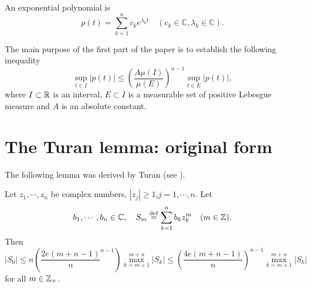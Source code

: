 \begin{definition}
  An exponential polynomial is
  \[
    p(t)=\sum_{k=1}^{n} c_k e^{\lambda_kt}\quad \left( c_k \in \mathbb{C},\lambda_k \in \mathbb{C} \right) .
  \]
\end{definition}
The main purpose of the first part of the paper is to establish the following inequality
\begin{equation}
  \sup_{t\in I}\left| p\left( t \right)  \right| \le \left( \frac{A\mu(I)}{\mu(E)} \right) ^{n-1}\sup_{t\in E}\left| p(t) \right| ,\label{main}
\end{equation}
where $I\subset \mathbb{R}$ is an interval, $E\subset I$ is a measurable set of positive Lebesgue measure and $A$ is an  absolute constant.
\section{The Turan lemma: original form}
The following lemma was derived by Turan (see \cite{turan1953neue}).
\begin{theorem}\label{theorem-1}
  Let $z_1,\cdots,z_n$ be complex numbers, $\left| z_j \right| \ge 1$,$j=1,\cdots,n$. Let
  \begin{equation*}
    b_1,\cdots,b_n\in \mathbb{C}, \quad S_m\overset{\mathrm{def}}{=}\sum_{k=1}^{n} b_kz_k^{m}\quad (m\in \mathbb{Z}).
  \end{equation*}
  Then
  \begin{equation}
    \left| S_0 \right|\le n\left( \frac{2e(m+n-1)}{n}^{n-1} \right) \max_{k=m+1}^{m+n}\left| S_k \right| \le \left( \frac{4e(m+n-1)}{n} \right) ^{n-1}\max_{k=m+1}^{m+n}\left| S_k \right| 	 \label{1}
  \end{equation}
  for all $m\in \mathbb{Z}_{+}$.

\end{theorem}
